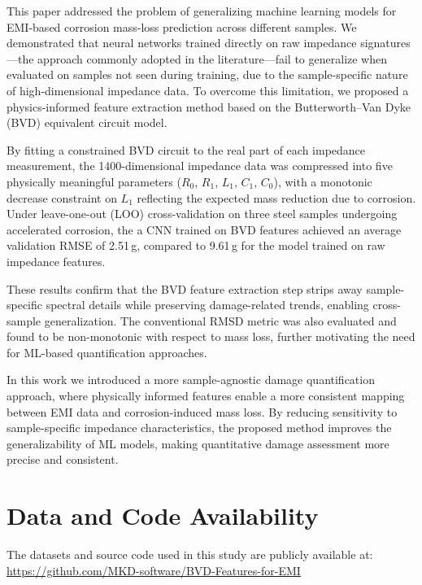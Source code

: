 \documentclass[journal,twoside,web]{ieeecolor}
\begin{document}
This paper addressed the problem of generalizing machine learning models for EMI-based corrosion mass-loss prediction across different samples. We demonstrated that neural networks trained directly on raw impedance signatures---the approach commonly adopted in the literature---fail to generalize when evaluated on samples not seen during training, due to the sample-specific nature of high-dimensional impedance data. To overcome this limitation, we proposed a physics-informed feature extraction method based on the Butterworth--Van Dyke (BVD) equivalent circuit model. 

By fitting a constrained BVD circuit to the real part of each impedance measurement, the 1400-dimensional impedance data was compressed into five physically meaningful parameters ($R_0$, $R_1$, $L_1$, $C_1$, $C_0$), with a monotonic decrease constraint on $L_1$ reflecting the expected mass reduction due to corrosion. Under leave-one-out (LOO) cross-validation on three steel samples undergoing accelerated corrosion, the a CNN trained on BVD features achieved an average validation RMSE of 2.51\,g, compared to 9.61\,g for the model trained on raw impedance features. 

These results confirm that the BVD feature extraction step strips away sample-specific spectral details while preserving damage-related trends, enabling cross-sample generalization. The conventional RMSD metric was also evaluated and found to be non-monotonic with respect to mass loss, further motivating the need for ML-based quantification approaches. 

In this work we introduced a more sample-agnostic damage quantification approach, where physically informed features enable a more consistent mapping between EMI data and corrosion-induced mass loss. By reducing sensitivity to sample-specific impedance characteristics, the proposed method improves the generalizability of ML models, making quantitative damage assessment more precise and consistent.




\section*{Data and Code Availability}

The datasets and source code used in this study are publicly available at: \url{https://github.com/MKD-software/BVD-Features-for-EMI}



\end{document}
